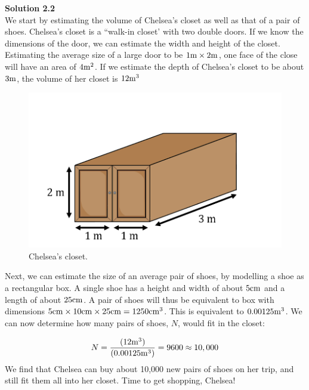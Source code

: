 \begin{framed}
\textbf{Solution 2.2}\\
We start by estimating the volume of Chelsea's closet as well as that of a pair of shoes. Chelsea's closet is a ``walk-in closet' with two double doors. If we know the dimensions of the door, we can estimate the width and height of the closet. Estimating the average size of a large door to be $1 {\rm m}\times 2 {\rm m}$, one face of the close will have an area of $4 {\rm m^2}$. If we estimate the depth of Chelsea's closet to be about $3 {\rm m}$, the volume of her closet is $12 {\rm m^3}$

\begin{figure}[!htbp]
\centering
\includegraphics[width=0.4\linewidth]{files/chelseashoes-1cdd94359cfb5edcf50c4a2dafb2b741.png}
\caption[]{Chelsea's closet.}
\label{fig:modelandexperiment:chelseashoes}
\end{figure}

Next, we can estimate the size of an average pair of shoes, by modelling a shoe as a rectangular box. A single shoe has a height and width of about $5 {\rm cm}$ and a length of about $25 {\rm cm}$. A pair of shoes will thus be equivalent to box with dimensions $5 {\rm cm} \times 10 {\rm cm} \times 25 {\rm cm} = 1250 {\rm cm^3}$. This is equivalent to $0.00125 {\rm m^3}$. We can now determine how many pairs of shoes, $N$, would fit in the closet:

\begin{equation}
N=\frac{(12 {\rm m^3})}{(0.00125 {\rm m^3})}= 9600\approx 10,000
\end{equation}
We find that Chelsea can buy about 10,000 new pairs of shoes on her trip, and still fit them all into her closet. Time to get shopping, Chelsea!
\end{framed}